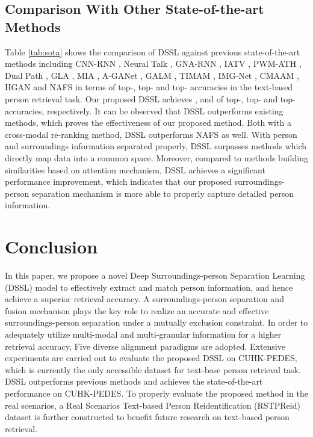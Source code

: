 \documentclass[sigconf]{acmart}
\begin{document}
\subsection{Comparison With Other State-of-the-art Methods}
Table \ref{tab:sota} shows the comparison of DSSL against  previous state-of-the-art methods including CNN-RNN \cite{reed2016learning}, Neural Talk \cite{vinyals2015show}, GNA-RNN \cite{Shuang2017Person}, IATV \cite{li2017identity}, PWM-ATH \cite{Chen2018}, Dual Path \cite{zheng2020dual}, GLA \cite{chen2018improving}, MIA \cite{niu2020improving}, A-GANet \cite{mm2019graphreid}, GALM \cite{Jing2018Pose}, TIMAM \cite{ARL}, IMG-Net \cite{wang2020img}, CMAAM \cite{aggarwal2020text}, HGAN \cite{zheng2020hierarchical} and NAFS \cite{gao2021contextual} in terms of top-, top- and top- accuracies in the text-based person retrieval task. Our proposed DSSL achieves ,  and  of top-, top- and top- accuracies, respectively. It can be observed that DSSL outperforms existing methods, which proves the effectiveness of our proposed method. Both with a cross-modal re-ranking method, DSSL outperforms NAFS as well. With person and surroundings information separated properly, DSSL surpasses methods which directly map data into a common space. Moreover, compared to methods building similarities based on attention mechanism, DSSL achieves a significant performance improvement, which indicates that our proposed surroundings-person separation mechanism is more able to properly capture detailed person information.

\section{Conclusion}
In this paper, we propose a novel Deep Surroundings-person Separation Learning (DSSL) model to effectively extract and match person information, and hence achieve a superior retrieval accuracy.  A surroundings-person separation and fusion mechanism plays the key role to realize an accurate and effective surroundings-person separation under a mutually exclusion constraint. In order to adequately utilize multi-modal and multi-granular information for a higher retrieval accuracy, Five diverse alignment paradigms are adopted. Extensive experiments are carried out to evaluate the proposed DSSL on CUHK-PEDES, which is currently the only accessible dataset for text-base person retrieval task. DSSL outperforms previous methods and achieves the state-of-the-art performance on CUHK-PEDES. To properly evaluate the proposed method in the real scenarios, a Real Scenarios Text-based Person Reidentification (RSTPReid) dataset is further constructed to benefit future research on text-based person retrieval.



\vfill\eject 

\balance


\appendix
\end{document}
